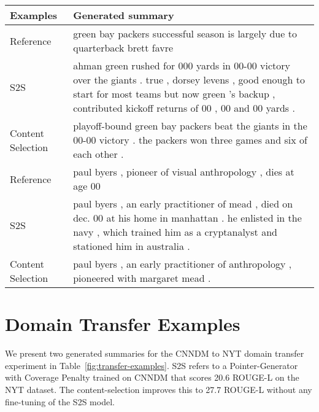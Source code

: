 \documentclass[11pt,a4paper]{article}
\begin{document}



\begin{table*}[!ht]
\begin{tabular}{@{}lp{}@{}}
\toprule
Examples & Generated summary \\ \midrule
Reference & green bay packers successful season is largely due to quarterback brett favre \\
S2S & ahman green rushed for 000 yards in 00-00 victory over the giants . true , dorsey levens , good enough to start for most teams but now green 's backup , contributed kickoff returns of 00 , 00 and 00 yards . \\
Content Selection & playoff-bound green bay packers beat the giants in the 00-00 victory . the packers won three games and six of each other . \\ \midrule
Reference & paul byers , pioneer of visual anthropology , dies at age 00 \\
S2S & paul byers , an early practitioner of mead , died on dec. 00 at his home in manhattan .  he enlisted in the navy , which trained him as a cryptanalyst and stationed him in australia . \\
Content Selection & paul byers , an early practitioner of anthropology , pioneered with margaret mead . \\ \bottomrule
\end{tabular}
\caption{\label{fig:transfer-examples}Domain-transfer examples.}
\end{table*}
\FloatBarrier
\appendix

\section{Domain Transfer Examples}
\label{app:transfer-examples}

We present two generated summaries for the \gls{CNNDM} to NYT domain transfer experiment in Table~\ref{fig:transfer-examples}. S2S refers to a Pointer-Generator with Coverage Penalty trained on \gls{CNNDM} that scores 20.6 ROUGE-L on the NYT dataset. The content-selection improves this to 27.7 ROUGE-L without any fine-tuning of the S2S model.
\end{document}
